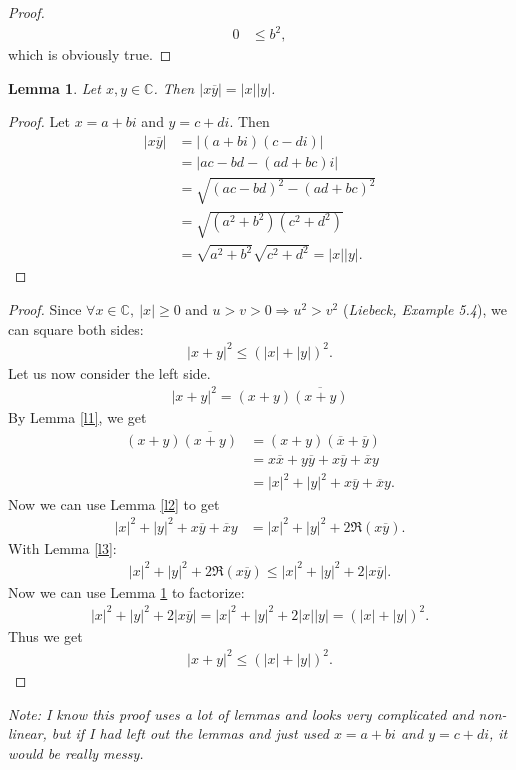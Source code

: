 \documentclass{article}
\newcommand*\lneg[1]{\overline{#1}}
\newcommand{\C}{\mathbb{C}}
\newtheorem{lemma}{Lemma}[section]
\begin{document}
\begin{adjustwidth}{2em}{0pt}
\begin{proof}
\begin{align*}
      0&\leq b^2,
    \end{align*}
    which is obviously true.
  \end{proof}
  \begin{lemma}
    \label{l4}
    Let $x,y\in\C$. Then $|x\lneg{y}|=|x||y|$.
  \end{lemma}
  \begin{proof}
    Let $x=a+bi$ and $y=c+di$. Then
    \begin{align*}
      |x\lneg{y}|&=|(a+bi)(c-di)|\\
      &=|ac-bd-(ad+bc)i|\\
      &=\sqrt{(ac-bd)^2-(ad+bc)^2}\\
      &=\sqrt{(a^2+b^2)(c^2+d^2)}\\
      &=\sqrt{a^2+b^2}\sqrt{c^2+d^2}=|x||y|.
    \end{align*} 
  \end{proof}
\end{adjustwidth}
\begin{proof}
  Since $\forall x\in\C,\:|x|\geq0$ and $u>v>0\Rightarrow u^2>v^2$ (\emph{Liebeck, Example 5.4}), we can square both sides:
  \begin{align*}
    |x+y|^2\leq (|x|+|y|)^2.
  \end{align*}
  Let us now consider the left side.
  \begin{align*}
    |x+y|^2=(x+y)\lneg{(x+y)}
  \end{align*}
  By Lemma \ref{l1}, we get
  \begin{align*}
    (x+y)\lneg{(x+y)}&=(x+y)(\lneg{x}+\lneg{y})\\
    &=x\lneg{x}+y\lneg{y}+x\lneg{y}+\lneg{x}y\\
    &=|x|^2+|y|^2+x\lneg{y}+\lneg{x}y.
  \end{align*}
  Now we can use Lemma \ref{l2} to get
  \begin{align*}
    |x|^2+|y|^2+x\lneg{y}+\lneg{x}y&=|x|^2+|y|^2+2\Re(x\lneg{y}).
  \end{align*}
  With Lemma \ref{l3}:
  \begin{align*}
    |x|^2+|y|^2+2\Re(x\lneg{y})\leq |x|^2+|y|^2+2|x\lneg{y}|.
  \end{align*}
  Now we can use Lemma \ref{l4} to factorize:
  \begin{align*}
   |x|^2+|y|^2+2|x\lneg{y}| = |x|^2+|y|^2+2|x||y| = (|x|+|y|)^2.
  \end{align*}
  Thus we get
  \begin{align*}
    |x+y|^2\leq (|x|+|y|)^2.
  \end{align*}
\end{proof}
\emph{Note: I know this proof uses a lot of lemmas and looks very complicated and non-linear, but if I had left out the lemmas and just used $x=a+bi$ and $y=c+di$, it would be really messy.}
\end{document}
